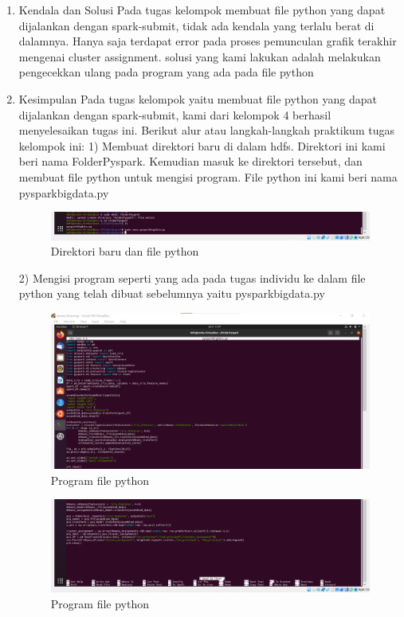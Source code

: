 \begin{enumerate}
\item Kendala dan Solusi
\newline Pada tugas kelompok membuat file python yang dapat dijalankan dengan spark-submit, tidak ada kendala yang terlalu berat di dalamnya. Hanya saja terdapat error pada proses pemunculan grafik terakhir mengenai cluster assignment. 
\newline solusi yang kami lakukan adalah melakukan pengecekkan ulang pada program yang ada pada file python

\item Kesimpulan
\newline Pada tugas kelompok yaitu membuat file python yang dapat dijalankan dengan spark-submit, kami dari kelompok 4 berhasil menyelesaikan tugas ini.
\newline Berikut alur atau langkah-langkah praktikum tugas kelompok ini:
1) Membuat direktori baru di dalam hdfs. Direktori ini kami beri nama FolderPyspark. Kemudian masuk ke direktori tersebut, dan membuat file python untuk mengisi program. File python ini kami beri nama pysparkbigdata.py 

\begin{figure}[!ht]
\includegraphics[width=.9\textwidth]{TugasKelompok/Kelompok4/direktoribarudanfilepython}
\caption{Direktori baru dan file python}
\label{gam:perkuliahan-23-09}
\end{figure}

2) Mengisi program seperti yang ada pada tugas individu ke dalam file python yang telah dibuat sebelumnya yaitu pysparkbigdata.py
\begin{figure}[!ht]
\includegraphics[width=.9\textwidth]{TugasKelompok/Kelompok4/programpython}
\caption{Program file python}
\label{gam:perkuliahan-23-09}
\end{figure}
\begin{figure}[!ht]
\includegraphics[width=.9\textwidth]{TugasKelompok/Kelompok4/programpython2}
\caption{Program file python}
\label{gam:perkuliahan-23-09}
\end{figure}


\end{enumerate}
